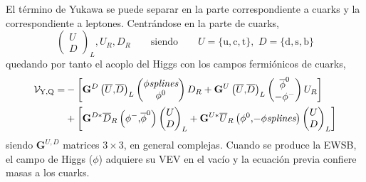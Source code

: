 El término de Yukawa se puede separar en la parte correspondiente a cuarks y la correspondiente a leptones. Centrándose en la parte de cuarks,
\begin{equation}
  \begin{pmatrix}
    U\\ D
  \end{pmatrix}_L, U_R, D_R \qquad \text{siendo} \qquad U=\{\mathrm{u,c,t}\},\,\,D=\{\mathrm{d,s,b}\}  
\end{equation}
quedando por tanto el acoplo del Higgs con los campos fermiónicos de cuarks,
\begin{equation}
\begin{split}
\mathcal{V}_{\text{Y,Q}}  = & 
- \left[\mathbf{G}^D \left(\overline{U},\!\overline{D} \right)_L \begin{pmatrix}
  \phi\emph{splines} \\ \phi^0
\end{pmatrix} D_R + 
\mathbf{G}^U \left(\overline{U},\!\overline{D} \right)_L \begin{pmatrix}
  \overline{\phi}^0 \\ -\phi^-
\end{pmatrix} U_R \right] \\ & +
%
%
\left[\mathbf{G}^{D*} \overline{D}_R\left(\phi^-,\!\overline{\phi}^0 \right) \begin{pmatrix}
  U \\ D
\end{pmatrix}_L + 
\mathbf{G}^{U*} \overline{U}_R \left(\phi^0,\!-\phi\emph{splines} \right) \begin{pmatrix}
  U \\ D
\end{pmatrix}_L \right]
\end{split}
\end{equation}
siendo $\mathbf{G}^{U,D}$ matrices $3\times3$, en general complejas. Cuando se produce la EWSB, el campo de Higgs ($\phi$) adquiere su VEV en el vacío y la ecuación previa confiere masas a los cuarks. 


